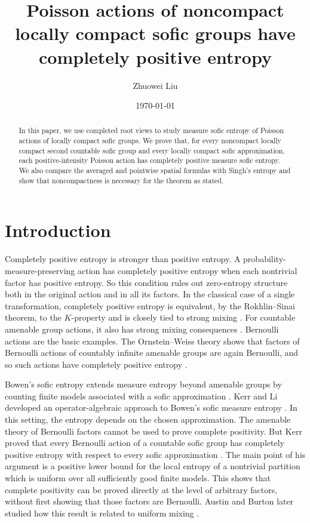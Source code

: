 \documentclass[12pt]{amsart}
\title[Poisson actions and completely positive sofic entropy]{Poisson actions of noncompact locally compact sofic groups have completely positive entropy}
\author{Zhuowei Liu}
\date{\today}
\theoremstyle{definition}
\newcommand{\1}{\mathbf 1}
\begin{document}
\begin{abstract}
In this paper, we use completed root views to study measure sofic entropy of
Poisson actions of locally compact sofic groups. We prove that, for every
noncompact locally compact second countable sofic group and every locally
compact sofic approximation, each positive-intensity Poisson action has
completely positive measure sofic entropy. 
We also compare the averaged and pointwise spatial formulas with Singh's entropy
and show that noncompactness is necessary for the theorem as stated.
\end{abstract}

\maketitle

\section{Introduction}

Completely positive entropy is stronger than positive entropy.
A probability-measure-preserving action has completely positive entropy when
each nontrivial factor has positive entropy. So this condition rules out
zero-entropy structure both in the original action and in all its factors.
In the classical case of a single transformation, completely
positive entropy is equivalent, by the Rokhlin--Sinai theorem, to the
$K$-property and is closely tied to strong mixing \cite{Glasner}. For countable amenable group actions, it also has strong mixing consequences
\cite{RudolphWeiss}. Bernoulli actions are the basic examples. The
Ornstein--Weiss theory shows that factors of Bernoulli actions of countably
infinite amenable groups are again Bernoulli, and so such actions have
completely positive entropy \cite{OrnsteinWeiss}.

Bowen's sofic entropy extends measure entropy beyond amenable groups by
counting finite models associated with a sofic approximation
\cite{BowenSofic,B12,B20,KerrLi1}. Kerr and Li developed an operator-algebraic approach to  Bowen’s
sofic measure entropy \cite{KerrLi2}. In this setting, the entropy depends on the chosen approximation. The
amenable theory of Bernoulli factors cannot be used to prove complete
positivity. But Kerr proved that every Bernoulli action of a countable sofic group has completely positive
entropy with respect to every sofic approximation \cite{KerrCPE}. The main
point of his argument is a positive lower bound for the local entropy of a
nontrivial partition which is uniform over all sufficiently good finite
models. This shows that complete positivity can be proved directly at the
level of arbitrary factors, without first showing that those factors are Bernoulli.
Austin and Burton later studied how this result is related to uniform mixing \cite{AustinBurton}.
\end{document}
